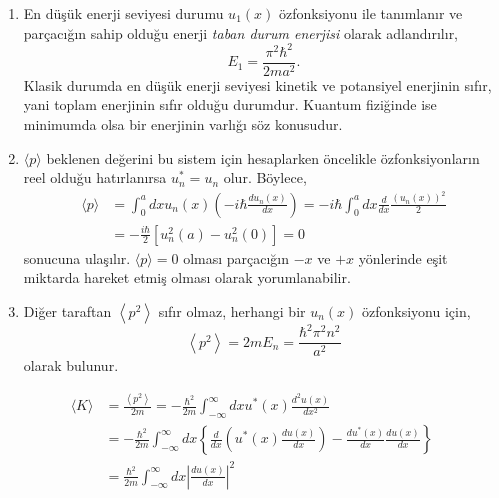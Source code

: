 \documentclass[a4paper,12pt, twoside]{article}
\begin{document}
\begin{enumerate}
	\item En düşük enerji seviyesi durumu $u_1(x)$ özfonksiyonu ile tanımlanır ve parçacığın sahip olduğu enerji \emph{taban durum enerjisi} olarak adlandırılır,
	\begin{equation}
	E _ { 1 } = \frac { \pi ^ { 2 } \hbar ^ { 2 } } { 2 m a ^ { 2 } }.
	\end{equation}
	Klasik durumda en düşük enerji seviyesi kinetik ve potansiyel enerjinin sıfır, yani toplam enerjinin sıfır olduğu durumdur. Kuantum fiziğinde ise minimumda olsa bir enerjinin varlığı söz konusudur.
	
	\item $\langle p \rangle$ beklenen değerini bu sistem için hesaplarken  öncelikle özfonksiyonların reel olduğu hatırlanırsa $u^\ast_{ n } = u _ { n }$ olur. Böylece,
	\begin{equation}
	\begin{aligned} 
	\langle p \rangle 
	& = \int _ { 0 } ^ { a } d x u _ { n } ( x ) \left( - i \hbar \frac { d u _ { n } ( x ) } { d x } \right) 
	= - i \hbar \int _ { 0 } ^ { a } d x \frac { d } { d x } \frac { \left( u _ {n} ( x ) \right) ^ { 2 } } { 2 } \\ 
	& = - \frac { i \hbar } { 2 } \left[ u _ { n } ^ { 2 } ( a ) - u _ { n } ^ { 2 } ( 0 ) \right] = 0 
	\end{aligned}
	\end{equation}
	sonucuna ulaşılır. $\langle p \rangle = 0$ olması parçacığın $-x$ ve $+x$ yönlerinde eşit miktarda hareket etmiş olması olarak yorumlanabilir.
	
	\item Diğer taraftan $\left\langle p ^ { 2 } \right\rangle$ sıfır olmaz, herhangi bir $u_n(x)$ özfonksiyonu için,
	\begin{equation}
	\left\langle p ^ { 2 } \right\rangle = 2 m E _ { n } = \frac { \hbar ^ { 2 } \pi ^ { 2 } n ^ { 2 } } { a ^ { 2 } }
	\end{equation}
	olarak bulunur.
	
	
\end{enumerate}








\begin{equation}
\begin{aligned} 
\langle K \rangle 
& = \frac { \left\langle p ^ { 2 } \right\rangle } { 2 m } = - \frac { \hbar ^ { 2 } } { 2 m } \int _ { - \infty } ^ { \infty } d x u ^ { * } ( x ) \frac { d ^ { 2 } u ( x ) } { d x ^ { 2 } } \\ 
& = - \frac { \hbar ^ { 2 } } { 2 m } \int _ { - \infty } ^ { \infty } d x \left\{ \frac { d } { d x } \left( u ^ { * } ( x ) \frac { d u ( x ) } { d x } \right) - \frac { d u ^ { * } ( x ) } { d x } \frac { d u ( x ) } { d x } \right\} \\ 
& = \frac { \hbar ^ { 2 } } { 2 m } \int _ { - \infty } ^ { \infty } d x \left| \frac { d u ( x ) } { d x } \right| ^ { 2 } 
\end{aligned}
\end{equation}
\end{document}

